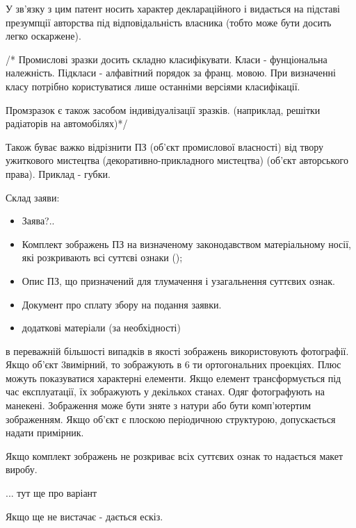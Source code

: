 У зв’язку з цим патент носить характер деклараційного і видається на підставі презумпції авторства під відповідальність власника (тобто може бути досить легко оскаржене). 

/* Промислові зразки досить складно класифікувати. Класи - фунціональна належність. Підкласи - алфавітний порядок за франц. мовою. При визначенні класу потрібно користуватися лише останніми версіями класифікації.

Промзразок є також засобом індивідуалізації зразків. (наприклад, решітки радіаторів на автомобілях)*/

Також буває важко відрізнити ПЗ (об’єкт промислової власності) від твору ужиткового мистецтва (декоративно-прикладного мистецтва) (об’єкт авторського права). Приклад - губки.

Склад заяви:
\begin{itemize}
	\item Заява?..
	\item Комплект зображень ПЗ на визначеному законодавством матеріальному носії, які розкривають всі суттєві ознаки ();
	\item Опис ПЗ, що призначений для тлумачення і узагальнення суттєвих ознак.
	\item Документ про сплату збору на подання заявки. 
	\item додаткові матеріали (за необхідності)
\end{itemize}

в переважній більшості випадків в якості зображень використовують фотографії. Якщо об’єкт 3вимірний, то зображують в 6 ти ортогональних проекціях. Плюс можуть показуватися характерні елементи. Якщо елемент трансформується під час експлуатації, їх зображують у декількох станах. Одяг фотографують на манекені. 
Зображення може бути зняте з натури або бути комп’ютертим зображенням.
Якщо об’єкт є плоскою періодичною структурою, допускається надати примірник.

Якщо комплект зображень не розкриває всіх суттєвих ознак то надається макет виробу. 

... тут ще про варіант

Якщо ще не вистачає - дається ескіз.